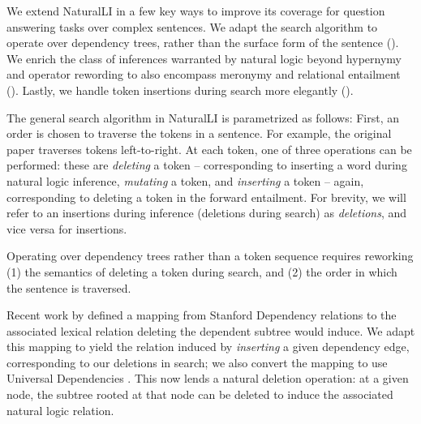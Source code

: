 We extend NaturalLI in a few key ways to improve its coverage for question
  answering tasks over complex sentences.
We adapt the search algorithm to operate over dependency
  trees, rather than the surface form of the sentence ().
We enrich the class of inferences warranted by natural logic beyond
  hypernymy and operator rewording to also encompass meronymy and
  relational entailment ().
Lastly, we handle token insertions during search more elegantly
  ().

The general search algorithm in NaturalLI is parametrized as follows:
First, an order is chosen to traverse the tokens in a sentence.
For example, the original paper traverses tokens left-to-right.
At each token, one of three operations can be performed:
  these are \textit{deleting} a token
  -- corresponding to inserting a word during natural logic inference,
  \textit{mutating} a token, and \textit{inserting} a token -- again, corresponding
  to deleting a token in the forward entailment.
For brevity, we will refer to an insertions during inference (deletions during
  search) as \textit{deletions}, and vice versa for insertions.

%
%
Operating over dependency trees rather than a token sequence requires reworking
  (1) the semantics of deleting a token during search, and 
  (2) the order in which the sentence is traversed.


Recent work by  defined a mapping from Stanford
  Dependency relations to the associated lexical relation deleting the
  dependent subtree would induce.
We adapt this mapping to yield the relation induced by \textit{inserting} a
  given dependency edge, corresponding to our deletions in search;
  we also convert the mapping to use Universal Dependencies
  \cite{key:stanford-ud}.
This now lends a natural deletion operation: at a given node, the subtree rooted
  at that node can be deleted to induce the associated natural logic relation.

